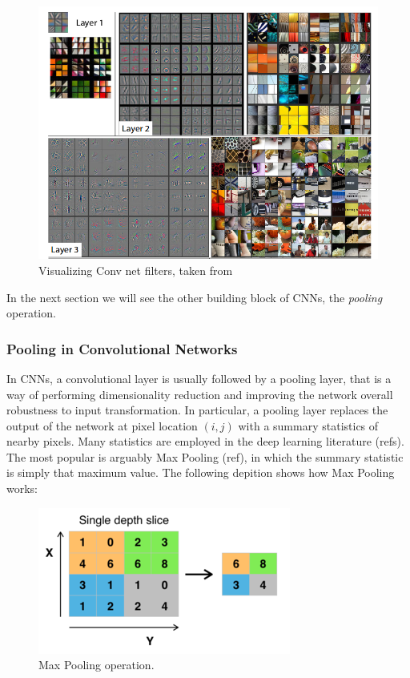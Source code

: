 \documentclass[../main.tex]{subfiles}
\begin{document}
    \begin{figure}[h!]
    	\includegraphics[width=\linewidth]{img/learned-conv-filters.png}
        \caption{Visualizing Conv net filters, taken from~\cite{zeiler13}}\label{fig:conv-filters}
	\end{figure}

    In the next section we will see the other building block of CNNs, the \textit{pooling} operation.

    \subsubsection{Pooling in Convolutional Networks}
    In CNNs, a convolutional layer is usually followed by a pooling layer, that is a way of performing dimensionality reduction
    and improving the network overall robustness to input transformation. In particular, a pooling layer replaces the output of the
    network at pixel location $(i, j)$ with a summary statistics of nearby pixels. Many statistics are employed in the deep learning
    literature (refs). The most popular is arguably Max Pooling (ref), in which the summary statistic is simply that maximum value.
    The following depition shows how Max Pooling works:

    \begin{figure}[h!]
        \centering
    	\includegraphics[width=.6\linewidth]{img/max-pooling.png}
        \caption{Max Pooling operation.}\label{fig:max-pooling}
	\end{figure}
\end{document}
